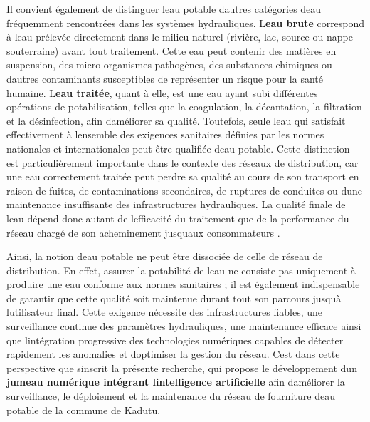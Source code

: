 \documentclass[12pt,a4paper,oneside]{report}
\begin{document}
Il convient également de distinguer l\textquotesingle eau potable
d\textquotesingle autres catégories d\textquotesingle eau fréquemment
rencontrées dans les systèmes hydrauliques.
L\textquotesingle{}\textbf{eau brute} correspond à l\textquotesingle eau
prélevée directement dans le milieu naturel (rivière, lac, source ou
nappe souterraine) avant tout traitement. Cette eau peut contenir des
matières en suspension, des micro-organismes pathogènes, des substances
chimiques ou d\textquotesingle autres contaminants susceptibles de
représenter un risque pour la santé humaine.
L\textquotesingle{}\textbf{eau traitée}, quant à elle, est une eau ayant
subi différentes opérations de potabilisation, telles que la
coagulation, la décantation, la filtration et la désinfection, afin
d\textquotesingle améliorer sa qualité. Toutefois, seule
l\textquotesingle eau qui satisfait effectivement à
l\textquotesingle ensemble des exigences sanitaires définies par les
normes nationales et internationales peut être qualifiée
d\textquotesingle eau potable. Cette distinction est particulièrement
importante dans le contexte des réseaux de distribution, car une eau
correctement traitée peut perdre sa qualité au cours de son transport en
raison de fuites, de contaminations secondaires, de ruptures de
conduites ou d\textquotesingle une maintenance insuffisante des
infrastructures hydrauliques. La qualité finale de l\textquotesingle eau
dépend donc autant de l\textquotesingle efficacité du traitement que de
la performance du réseau chargé de son acheminement
jusqu\textquotesingle aux consommateurs \cite{ref1}.

Ainsi, la notion d\textquotesingle eau potable ne peut être dissociée de
celle de réseau de distribution. En effet, assurer la potabilité de
l\textquotesingle eau ne consiste pas uniquement à produire une eau
conforme aux normes sanitaires ; il est également indispensable de
garantir que cette qualité soit maintenue durant tout son parcours
jusqu\textquotesingle à l\textquotesingle utilisateur final. Cette
exigence nécessite des infrastructures fiables, une surveillance
continue des paramètres hydrauliques, une maintenance efficace ainsi que
l\textquotesingle intégration progressive des technologies numériques
capables de détecter rapidement les anomalies et
d\textquotesingle optimiser la gestion du réseau. C\textquotesingle est
dans cette perspective que s\textquotesingle inscrit la présente
recherche, qui propose le développement d\textquotesingle un
\textbf{jumeau numérique intégrant l\textquotesingle intelligence
artificielle} afin d\textquotesingle améliorer la surveillance, le
déploiement et la maintenance du réseau de fourniture
d\textquotesingle eau potable de la commune de Kadutu.
\end{document}
